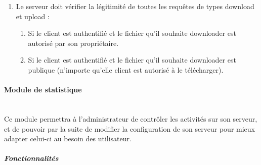 \documentclass[10pt,a4paper]{report}
\begin{document}
	\begin{enumerate}
		\item Le serveur doit vérifier la légitimité de toutes les requêtes de types download et upload :
		\begin{enumerate}
			\item Si le client est authentifié et le fichier qu'il souhaite downloader est autorisé par son propriétaire.
			\item Si le client est authentifié et le fichier qu'il souhaite downloader est publique (n'importe qu'elle client est autorisé à le télécharger).
		\end{enumerate}
	\end{enumerate}
	
\paragraph{Module de statistique \\ \\}

	Ce module permettra à l'administrateur de contrôler les activités sur son serveur, et 	de pouvoir par la suite de modifier la configuration de son serveur pour mieux adapter celui-ci au besoin des utilisateur.

	\subparagraph{Fonctionnalités}
\end{document}
